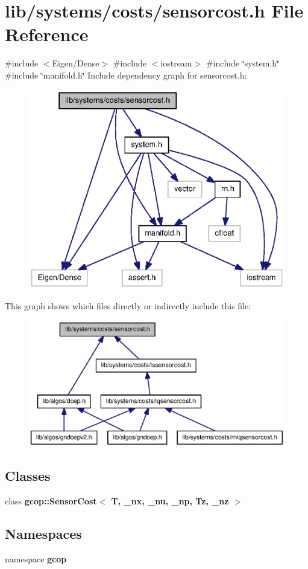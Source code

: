 \section{lib/systems/costs/sensorcost.h \-File \-Reference}
\label{sensorcost_8h}
{\ttfamily \#include $<$\-Eigen/\-Dense$>$}\*
{\ttfamily \#include $<$iostream$>$}\*
{\ttfamily \#include \char`\"{}system.\-h\char`\"{}}\*
{\ttfamily \#include \char`\"{}manifold.\-h\char`\"{}}\*
\-Include dependency graph for sensorcost.\-h\-:
\nopagebreak
\begin{figure}[H]
\begin{center}
\leavevmode
\includegraphics[width=350pt]{sensorcost_8h__incl}
\end{center}
\end{figure}
\-This graph shows which files directly or indirectly include this file\-:
\nopagebreak
\begin{figure}[H]
\begin{center}
\leavevmode
\includegraphics[width=350pt]{sensorcost_8h__dep__incl}
\end{center}
\end{figure}
\subsection*{\-Classes}
\begin{DoxyCompactItemize}
\item 
class {\bf gcop\-::\-Sensor\-Cost$<$ T, \-\_\-nx, \-\_\-nu, \-\_\-np, Tz, \-\_\-nz $>$}
\end{DoxyCompactItemize}
\subsection*{\-Namespaces}
\begin{DoxyCompactItemize}
\item 
namespace {\bf gcop}
\end{DoxyCompactItemize}
